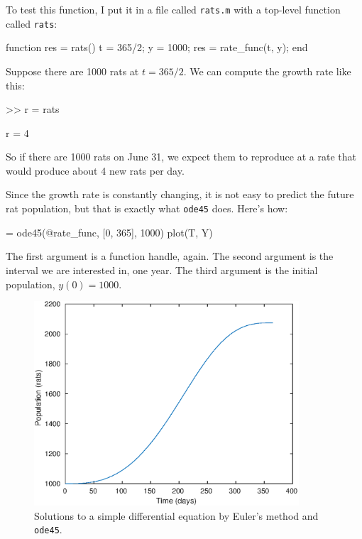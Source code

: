 \documentclass[main.tex]{subfiles}
\begin{document}
To test this function, I put it in a file called {\tt rats.m} with a top-level function called {\tt rats}:

\begin{code}
function res = rats()
    t = 365/2;
    y = 1000;
    res = rate_func(t, y);
end
\end{code}

Suppose there are 1000 rats at $t=365/2$.  We can compute the growth rate like this:

\begin{code}
>> r = rats

r = 4
\end{code}

So if there are 1000 rats on June 31, we expect them to 
reproduce at a rate that would produce about 4 new rats per day. 

Since the growth rate is constantly changing, it is not easy to predict
the future rat population, but that is exactly what {\tt ode45} does.
Here's how:

\begin{code}
[T, Y] = ode45(@rate_func, [0, 365], 1000)
plot(T, Y)
\end{code}

The first argument is a function handle, again.  The second argument is the interval we are interested
in, one year.  
The third argument is the initial population, $y(0) = 1000$.


\begin{figure}
\centerline{\includegraphics[height=3in]{book/figs/rats.eps}}
\caption{Solutions to a simple differential equation by Euler's method and {\tt ode45}.}
\label{fig:rats}
\end{figure}
\end{document}
